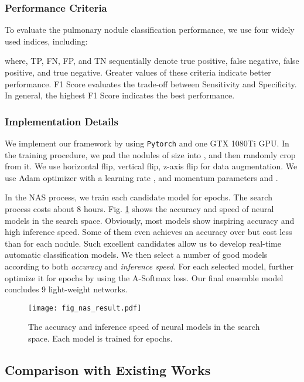 \documentclass[final,5p,times,twocolumn]{elsarticle}
\begin{document}
\subsubsection{Performance Criteria} 
\label{ssec:exp_crit}
To evaluate the pulmonary nodule classification performance, we use four widely used indices, including:

where, TP, FN, FP, and TN sequentially denote true positive, false negative, false positive, and true negative. Greater values of these criteria indicate better performance. F1 Score evaluates the trade-off between Sensitivity and Specificity. In general, the highest F1 Score indicates the best performance. 


\subsubsection{Implementation Details} 
\label{ssec:train}
We implement our framework by using \texttt{Pytorch} and one GTX 1080Ti GPU. In the training procedure, we pad the nodules of size  into , and then randomly crop  from it. We use horizontal flip, vertical flip, z-axis flip for data augmentation. We use Adam optimizer with a learning rate , and momentum parameters  and . 

In the NAS process, we train each candidate model for  epochs. The search process costs about 8 hours. Fig. \ref{fig:space} shows the accuracy and speed of neural models in the search space. Obviously, most models show inspiring accuracy and high inference speed. Some of them even achieves an accuracy over  but cost less than  for each nodule. Such excellent candidates allow us to develop real-time automatic classification models. We then select a number of good models according to both \textit{accuracy} and \textit{inference speed}. For each selected model, further optimize it for  epochs by using the A-Softmax loss. Our final ensemble model concludes 9 light-weight networks. 



\begin{figure}
\centering
\texttt{[image: fig\_nas\_result.pdf]} \\
\caption{The accuracy and inference speed of neural models in the search space. Each model is trained for  epochs.}
\label{fig:space}
\end{figure}


\subsection{Comparison with Existing Works}
\label{ssec:exp_comp}
\end{document}
